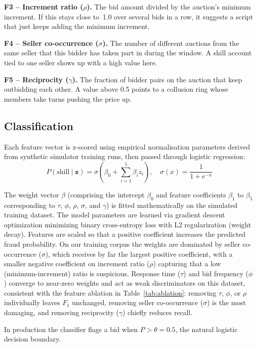 \documentclass[conference]{IEEEtran}
\begin{document}
\textbf{F3 -- Increment ratio ($\rho$).} The bid amount divided by the
auction's minimum increment. If this stays close to~1.0 over several bids
in a row, it suggests a script that just keeps adding the minimum
increment.

\textbf{F4 -- Seller co-occurrence ($\sigma$).} The number of different
auctions from the same seller that this bidder has taken part in during
the window. A shill account tied to one seller shows up with a high value
here.

\textbf{F5 -- Reciprocity ($\gamma$).} The fraction of bidder pairs on
the auction that keep outbidding each other. A value above 0.5 points to
a collusion ring whose members take turns pushing the price up.

\subsection{Classification}

Each feature vector is z-scored using empirical normalisation parameters derived
from synthetic simulator training runs, then passed through logistic regression:
\[
  P(\text{shill} \mid \mathbf{z}) = \sigma\!\left(\beta_0 + \sum_{i=1}^{5}
  \beta_i z_i\right), \quad \sigma(x) = \frac{1}{1+e^{-x}}
\]

The weight vector $\beta$ (comprising the intercept $\beta_0$ and feature coefficients $\beta_1$ to $\beta_5$ corresponding to $\tau$, $\phi$, $\rho$, $\sigma$, and $\gamma$) is fitted mathematically on the simulated training dataset. The model parameters are learned via gradient descent optimization minimizing binary cross-entropy loss with L2 regularization (weight decay). Features are scaled so that a positive coefficient increases the predicted fraud probability. On our training corpus the weights are dominated by seller co-occurrence ($\sigma$), which receives by far the largest positive coefficient, with a smaller negative coefficient on increment ratio ($\rho$) capturing that a low (minimum-increment) ratio is suspicious. Response time ($\tau$) and bid frequency ($\phi$) converge to near-zero weights and act as weak discriminators on this dataset, consistent with the feature ablation in Table~\ref{tab:ablation}: removing $\tau$, $\phi$, or $\rho$ individually leaves $F_1$ unchanged, removing seller co-occurrence ($\sigma$) is the most damaging, and removing reciprocity ($\gamma$) chiefly reduces recall.

In production the classifier flags a bid when $P > \theta = 0.5$, the
natural logistic decision boundary.
\end{document}
